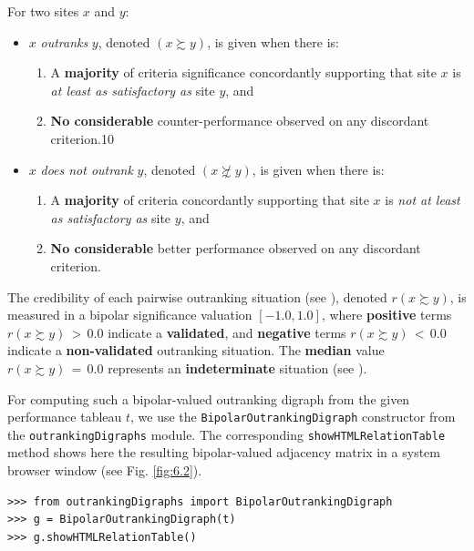 For two sites $x$ and $y$:
\begin{itemize}
\item $x$ \emph{outranks} $y$, denoted $(x \succsim y)$, is given when there is:
   \begin{enumerate}
     \item A \textbf{majority} of criteria significance concordantly supporting that site $x$ is \emph{at least as satisfactory as} site $y$, and
     \item \textbf{No considerable} counter-performance observed on any discordant criterion.10
       
    \end{enumerate}
\item $x$ \emph{does not outrank} $y$, denoted $(x \not\succsim y)$, is given when there is:
   \begin{enumerate}
    \item A \textbf{majority} of criteria concordantly supporting that site $x$ is \emph{not at least as satisfactory as} site $y$, and
    \item \textbf{No considerable} better performance observed on any discordant criterion.
    \end{enumerate}
\end{itemize}

The credibility of each pairwise outranking situation (see \citet{BIS-2013}), denoted $r(x \succsim y)$, is measured in a bipolar significance valuation $[-1.0, 1.0]$, where \textbf{positive} terms $r(x \succsim y)\, >\, 0.0$ indicate a \textbf{validated}, and \textbf{negative} terms $r(x \succsim y)\, <\, 0.0$ indicate a \textbf{non-validated} outranking situation. The \textbf{median} value $r(x \succsim y)\, = \,0.0$ represents an \textbf{indeterminate} situation (see \citet{BIS-2004a}).   

For computing such a bipolar-valued outranking digraph from the given performance tableau $t$, we use the \texttt{BipolarOutrankingDigraph} constructor from the \texttt{outrankingDigraphs} module. The corresponding \texttt{showHTMLRelationTable} method shows here the resulting bipolar-valued adjacency matrix in a system browser window (see Fig. \ref{fig:6.2}).

\begin{lstlisting}
>>> from outrankingDigraphs import BipolarOutrankingDigraph
>>> g = BipolarOutrankingDigraph(t)
>>> g.showHTMLRelationTable()
\end{lstlisting}

